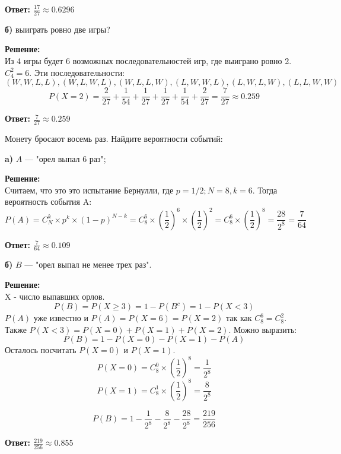 \documentclass[a4paper,12pt]{article}
\renewcommand{\geq}{\geqslant}
\newcounter{z}
\newcommand{\z}{\refstepcounter{z}\vskip 20pt\noindent
\fbox{\textbf{\arabic{z}}} }
\begin{document}
\textbf{Ответ: $\frac{17}{27} \approx0.6296$}

{\bf б)} выиграть ровно две игры?

\textbf{Решение:}\\
Из 4 игры будет 6 возможных последовательностей игр, где выиграно ровно 2. $C^2_4 = 6$. Эти последовательности: 
$$(W, W, L, L), (W, L, W, L), (W, L, L, W), (L, W, W, L), (L, W, L, W), (L, L, W, W)$$
$$P(X = 2) =  \frac{2}{27}+\frac{1}{54}+\frac{1}{27}+\frac{1}{27}+\frac{1}{54}+\frac{2}{27} = \frac{7}{27}\approx0.259$$

\textbf{Ответ: $\frac{7}{27} \approx0.259$}

\z Монету бросают восемь раз. Найдите вероятности событий:

{\bf a)} $A$ --- "орел выпал 6 раз";

\textbf{Решение:}\\
Считаем, что это это испытание Бернулли, где $p=1/2; N=8, k=6$. Тогда вероятность события A:
$$P(A) = C^k_N\times p^k \times (1-p)^{N-k} = C^6_8\times ({\frac{1}{2}})^6 \times ({\frac{1}{2}})^{2} = C^6_8\times ({\frac{1}{2}})^8= \frac{28}{2^8}=\frac{7}{64}$$

\textbf{Ответ: $\frac{7}{64} \approx0.109$}

{\bf б)} $B$ --- "орел выпал не менее трех раз".

\textbf{Решение:}\\
X - число выпавших орлов.
$$P(B) = P(X \geq 3)=1-P(B^c)= 1-P(X<3)$$
$P(A)$ уже известно и $P(A) = P(X=6) = P(X=2)$ так как $C^6_8=C^2_8$. Также $P(X<3) = P(X=0)+P(X=1)+P(X=2)$. Можно выразить:
$$P(B) = 1-P(X=0)-P(X=1)-P(A)$$
Осталось посчитать $P(X=0)$ и $P(X=1)$.
$$P(X=0) = C^0_8\times ({\frac{1}{2}})^8= \frac{1}{2^8}$$
$$P(X=1) = C^1_8\times ({\frac{1}{2}})^8= \frac{8}{2^8}$$


$$P(B) = 1-\frac{1}{2^8}-\frac{8}{2^8}-\frac{28}{2^8} =\frac{219}{256} $$

\textbf{Ответ: $\frac{219}{256} \approx0.855$}
\end{document}
